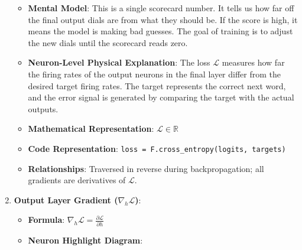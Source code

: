 \documentclass{article}
\begin{document}
\begin{enumerate}
\begin{itemize}
      \item \textbf{Mental Model}: This is a single scorecard number. It tells us how far off the final output dials are from what they should be. If the score is high, it means the model is making bad guesses. The goal of training is to adjust the new dials until the scorecard reads zero.
      \item \textbf{Neuron-Level Physical Explanation}: The loss $\mathcal{L}$ measures how far the firing rates of the output neurons in the final layer differ from the desired target firing rates. The target represents the correct next word, and the error signal is generated by comparing the target with the actual outputs.
      \item \textbf{Mathematical Representation}: $\mathcal{L} \in \mathbb{R}$
      \item \textbf{Code Representation}: \texttt{loss = F.cross\_entropy(logits, targets)}
      \item \textbf{Relationships}: Traversed in reverse during backpropagation; all gradients are derivatives of $\mathcal{L}$.
    \end{itemize}

  \item \textbf{Output Layer Gradient ($\nabla_h \mathcal{L}$)}:
    \begin{itemize}
      \item \textbf{Formula}: $\nabla_h \mathcal{L} = \frac{\partial \mathcal{L}}{\partial h}$
      \item \textbf{Neuron Highlight Diagram}:

\begin{center}
\begin{adjustbox}{max width=0.85\linewidth}
\end{adjustbox}
\end{center}
\end{itemize}
\end{enumerate}
\end{document}
